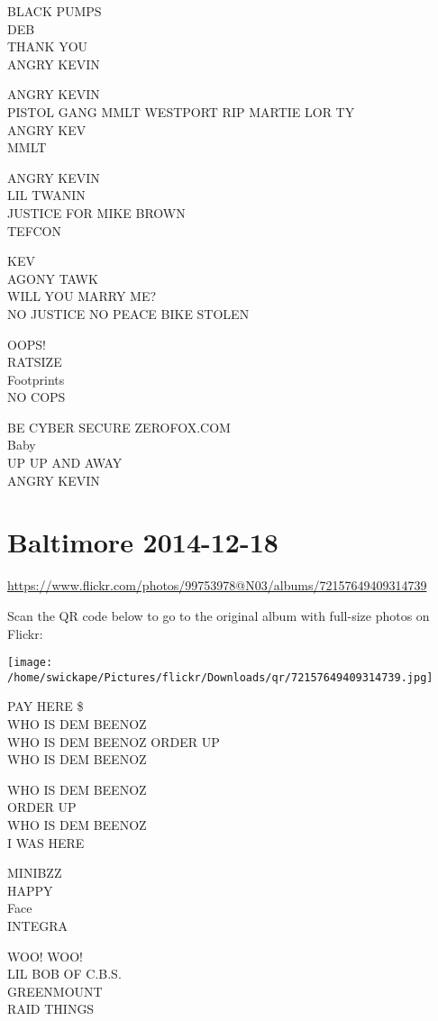 \documentclass[10pt,letterpaper]{article}
\begin{document}
BLACK PUMPS\\
DEB\\
THANK YOU\\
ANGRY KEVIN

ANGRY KEVIN\\
PISTOL GANG MMLT WESTPORT RIP MARTIE LOR TY\\
ANGRY KEV\\
MMLT

ANGRY KEVIN\\
LIL TWANIN\\
JUSTICE FOR MIKE BROWN\\
TEFCON

KEV\\
AGONY TAWK\\
WILL YOU MARRY ME?\\
NO JUSTICE NO PEACE BIKE STOLEN

OOPS!\\
RATSIZE\\
Footprints\\
NO COPS

BE CYBER SECURE ZEROFOX.COM\\
Baby\\
UP UP AND AWAY\\
ANGRY KEVIN


\section*{Baltimore 2014-12-18}

\url{https://www.flickr.com/photos/99753978@N03/albums/72157649409314739}

Scan the QR code below to go to the original album with full-size photos on Flickr:

\texttt{[image: /home/swickape/Pictures/flickr/Downloads/qr/72157649409314739.jpg]}


PAY HERE \$\\
WHO IS DEM BEENOZ\\
WHO IS DEM BEENOZ ORDER UP\\
WHO IS DEM BEENOZ

WHO IS DEM BEENOZ\\
ORDER UP\\
WHO IS DEM BEENOZ\\
I WAS HERE

MINIBZZ\\
HAPPY\\
Face\\
INTEGRA

WOO!  WOO!\\
LIL BOB OF C.B.S.\\
GREENMOUNT\\
RAID THINGS
\end{document}
